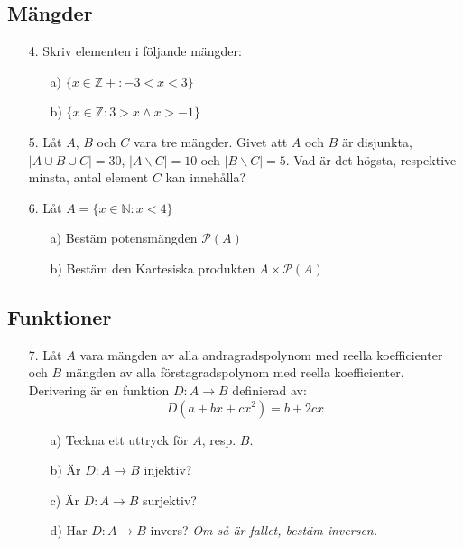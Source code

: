 \documentclass{article}
\begin{document}
\subsection*{Mängder}
\begin{enumerate}
\item[4.] Skriv elementen i följande mängder:
\begin{itemize}
\item[a)] $\{ x \in \mathbb{Z+} : -3 < x < 3 \}$
\item[b)] $\{ x \in \mathbb{Z} : 3 > x \land x > -1 \} $
\end{itemize}

\item[5.] Låt $A$, $B$ och $C$ vara tre mängder. Givet att $A$ och $B$ är disjunkta,
$|A \cup B \cup C| = 30$, $|A \backslash C|=10$ och $|B \backslash C|=5$. Vad är det högsta, respektive minsta, antal element $C$ kan innehålla?

\item[6.] Låt $A = \{ x \in \mathbb{N} : x < 4\}$
\begin{itemize}
\item[a)] Bestäm potensmängden $\mathcal P \left({A}\right)$
\item[b)] Bestäm den Kartesiska produkten $A \times \mathcal P \left({A}\right)$
\end{itemize}
\end{enumerate}

\subsection*{Funktioner}
\begin{enumerate}
\item[7.] Låt $A$ vara mängden av alla andragradspolynom med reella koefficienter och $B$ mängden av alla förstagradspolynom med reella koefficienter.\\
Derivering är en funktion $D: A \longrightarrow B$ definierad av:
\[D(a+bx+cx^2)=b+2cx\]
\begin{itemize}
\item[a)] Teckna ett uttryck för $A$, resp. $B$.
\item[b)] Är $D: A \longrightarrow B$ injektiv?
\item[c)] Är $D: A \longrightarrow B$ surjektiv?
\item[d)] Har $D: A \longrightarrow B$ invers? {\it Om så är fallet, bestäm inversen.}
\end{itemize}
\end{enumerate}
\end{document}
